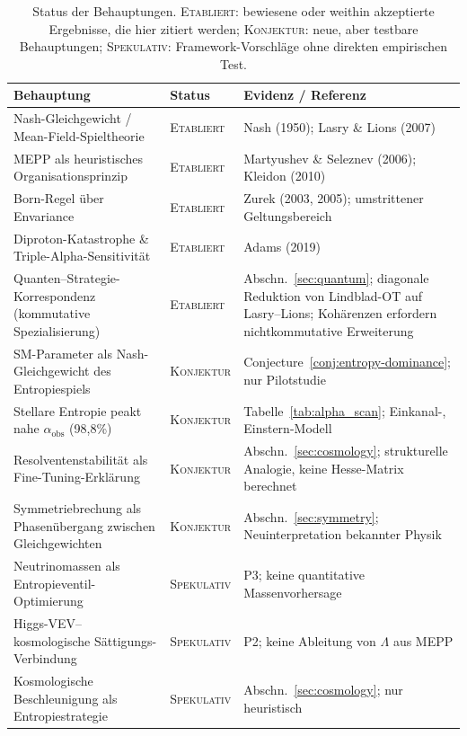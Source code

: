 \documentclass[12pt,a4paper]{article}
\theoremstyle{remark}
\begin{document}
\begin{table}[htbp]
\centering
\caption{Status der Behauptungen. \textsc{Etabliert}: bewiesene oder weithin akzeptierte Ergebnisse, die hier zitiert werden; \textsc{Konjektur}: neue, aber testbare Behauptungen; \textsc{Spekulativ}: Framework-Vorschl\"age ohne direkten empirischen Test.}
\label{tab:status-claims}
\small
\begin{tabular}{p{4.8cm}lp{5.2cm}}
\toprule
\textbf{Behauptung} & \textbf{Status} & \textbf{Evidenz / Referenz} \\
\midrule
Nash-Gleichgewicht / Mean-Field-Spieltheorie & \textsc{Etabliert} & Nash (1950); Lasry \& Lions (2007) \\
MEPP als heuristisches Organisationsprinzip & \textsc{Etabliert} & Martyushev \& Seleznev (2006); Kleidon (2010) \\
Born-Regel \"uber Envariance & \textsc{Etabliert} & Zurek (2003, 2005); umstrittener Geltungsbereich \\
Diproton-Katastrophe \& Triple-Alpha-Sensitivit\"at & \textsc{Etabliert} & Adams (2019) \\
Quanten--Strategie-Korrespondenz (kommutative Spezialisierung) & \textsc{Etabliert} & Abschn.~\ref{sec:quantum}; diagonale Reduktion von Lindblad-OT auf Lasry--Lions; Koh\"arenzen erfordern nichtkommutative Erweiterung \\
SM-Parameter als Nash-Gleichgewicht des Entropiespiels & \textsc{Konjektur} & Conjecture~\ref{conj:entropy-dominance}; nur Pilotstudie \\
Stellare Entropie peakt nahe $\alpha_{\text{obs}}$ (98,8\%) & \textsc{Konjektur} & Tabelle~\ref{tab:alpha_scan}; Einkanal-, Einstern-Modell \\
Resolventenstabilit\"at als Fine-Tuning-Erkl\"arung & \textsc{Konjektur} & Abschn.~\ref{sec:cosmology}; strukturelle Analogie, keine Hesse-Matrix berechnet \\
Symmetriebrechung als Phasen\"ubergang zwischen Gleichgewichten & \textsc{Konjektur} & Abschn.~\ref{sec:symmetry}; Neuinterpretation bekannter Physik \\
Neutrinomassen als Entropieventil-Optimierung & \textsc{Spekulativ} & P3; keine quantitative Massenvorhersage \\
Higgs-VEV--kosmologische S\"attigungs-Verbindung & \textsc{Spekulativ} & P2; keine Ableitung von $\Lambda$ aus MEPP \\
Kosmologische Beschleunigung als Entropiestrategie & \textsc{Spekulativ} & Abschn.~\ref{sec:cosmology}; nur heuristisch \\
\bottomrule
\end{tabular}
\end{table}
\end{document}
